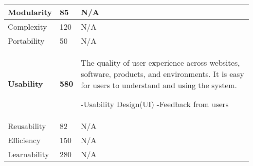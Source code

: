 \begin{center}
\begin{tabular}{| l | l | p{6cm} |}
			Modularity & 85 & N\slash A \\ \hline
			
			Complexity & 120 & N\slash A \\ \hline
			
			Portability & 50 & N\slash A \\ \hline
			
			\textbf{Usability} & \textbf{580} & The quality of user experience across websites, software, products, and environments. It is easy for users to understand and using the system.

			-Usability Design(UI)
			-Feedback from users \\ \hline
			
			Reusability & 82 & N\slash A \\ \hline
			
			Efficiency & 150 & N\slash A \\ \hline
			
			Learnability & 280 & N\slash A \\ 
			
   		 \hline
	\end{tabular}
\end{center}


